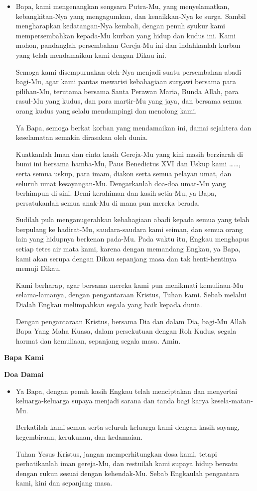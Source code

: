 \documentclass[a5paper,headsepline,titlepage,10pt]{scrbook}
\makeatletter
\newcommand{\subjudul}[1]{%
  {\parindent \z@ \normalfont
    \interlinepenalty\@M \bfseries #1\par\nobreak \vskip 20\p@ }}
\newcommand{\BI}[1]{\begin{itemize} \item[I:] #1 \end{itemize}}
\makeatother
\begin{document}
\BI{Bapa, kami mengenangkan sengsara Putra-Mu, yang menyelamatkan, kebangkitan-Nya yang mengagumkan, dan kenaikkan-Nya ke surga. Sambil mengharapkan kedatangan-Nya kembali, dengan penuh syukur kami mempersembahkan kepada-Mu kurban yang hidup dan kudus ini. Kami mohon, pandanglah persembahan Gereja-Mu ini dan indahkanlah kurban yang telah mendamaikan kami dengan Dikau ini.

Semoga kami disempurnakan oleh-Nya menjadi suatu persembahan abadi bagi-Mu, agar kami pantas mewarisi kebahagiaan surgawi bersama para pilihan-Mu, terutama bersama Santa Perawan Maria, Bunda Allah, para rasul-Mu yang kudus, dan para martir-Mu yang jaya, dan bersama semua orang kudus yang selalu mendampingi dan menolong kami.

Ya Bapa, semoga berkat korban yang mendamaikan ini, damai sejahtera dan keselamatan semakin dirasakan oleh dunia.

Kuatkanlah Iman dan cinta kasih Gereja-Mu yang kini masih berziarah di bumi ini bersama hamba-Mu, Paus Benedictus XVI dan Uskup kami \dots \dots, serta semua uskup, para imam, diakon serta semua pelayan umat, dan seluruh umat kesayangan-Mu. Dengarkanlah doa-doa umat-Mu yang berhimpun di sini. Demi kerahiman dan kasih setia-Mu, ya Bapa, persatukanlah semua anak-Mu di mana pun mereka berada.

Sudilah pula menganugerahkan kebahagiaan abadi kepada semua yang telah berpulang ke hadirat-Mu, saudara-saudara kami seiman, dan semua orang lain yang hidupnya berkenan pada-Mu. Pada waktu itu, Engkau menghapus setiap tetes air mata kami, karena dengan memandang Engkau, ya Bapa, kami akan serupa dengan Dikau sepanjang masa dan tak henti-hentinya memuji Dikau.

Kami berharap, agar bersama mereka kami pun menikmati kemuliaan-Mu selama-lamanya, dengan pengantaraan Kristus, Tuhan kami. Sebab melalui Dialah Engkau melimpahkan segala yang baik kepada dunia.

Dengan pengantaraan Kristus, bersama Dia dan dalam Dia, bagi-Mu Allah Bapa Yang Maha Kuasa, dalam persekutuan dengan Roh Kudus, segala hormat dan kemuliaan, sepanjang segala masa. Amin.}

\subjudul{Bapa Kami}

\subjudul{Doa Damai}

\BI{Ya Bapa, dengan penuh kasih Engkau telah menciptakan dan menyertai keluarga-keluarga supaya menjadi sarana dan tanda bagi karya kesela-matan-Mu.

Berkatilah kami semua serta seluruh keluarga kami dengan kasih sayang, kegembiraan, kerukunan, dan kedamaian.

Tuhan Yesus Kristus, jangan memperhitungkan dosa kami, tetapi perhatikanlah iman gereja-Mu, dan restuilah kami supaya hidup bersatu dengan rukun sesuai dengan kehendak-Mu. Sebab Engkaulah pengantara kami, kini dan sepanjang masa.}
\end{document}
